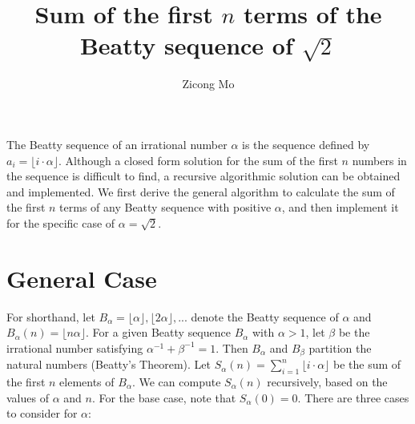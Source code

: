 \documentclass[oneside, 12pt]{article}
\begin{document}
\title{Sum of the first $n$ terms of the Beatty sequence of $\sqrt{2}$}
\author{Zicong Mo}
\maketitle
The Beatty sequence of an irrational number $\alpha$ is the sequence defined by $a_i = \lfloor i \cdot \alpha \rfloor$. Although a closed form solution for the sum of the first $n$ numbers in the sequence is difficult to find, a recursive algorithmic solution can be obtained and implemented. We first derive the general algorithm to calculate the sum of the first $n$ terms of any Beatty sequence with positive $\alpha$, and then implement it for the specific case of $\alpha = \sqrt{2}$. 
\section*{General Case}
For shorthand, let $B_{\alpha} = \lfloor \alpha \rfloor,\lfloor 2\alpha \rfloor,... $ denote the Beatty sequence of $\alpha$ and $B_{\alpha}(n) = \lfloor n\alpha \rfloor$. For a given Beatty sequence $B_{\alpha}$ with $\alpha > 1$, let $\beta$ be the irrational number satisfying $\alpha^{-1} + \beta^{-1} = 1$. Then $B_{\alpha}$ and $B_{\beta}$ partition the natural numbers (Beatty's Theorem). Let $S_{\alpha}(n) = \sum_{i=1}^n \lfloor i \cdot \alpha \rfloor $ be the sum of the first $n$ elements of $B_{\alpha}$. We can compute $S_{\alpha}(n)$ recursively, based on the values of $\alpha$ and $n$. For the base case, note that $S_{\alpha}(0) = 0$. There are three cases to consider for $\alpha$:
\end{document}
